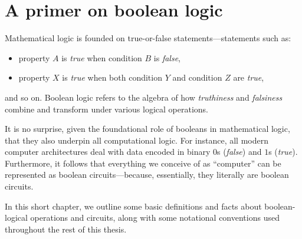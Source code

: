 \chapter{A primer on boolean logic}

Mathematical logic is founded on true-or-false statements---statements such as:
\begin{itemize}[nosep]
  \item property \(A\) is \emph{true} when condition \(B\) is \emph{false},
  \item property \(X\) is \emph{true} when both condition \(Y\) and condition
    \(Z\) are \emph{true},
\end{itemize}
and so on.  Boolean logic refers to the algebra of how \emph{truthiness} and
\emph{falsiness} combine and transform under various logical operations.

It is no surprise, given the foundational role of booleans in mathematical
logic, that they also underpin all computational logic. For instance, all
modern computer architectures deal with data encoded in binary \(0\)s
(\emph{false}) and \(1\)s (\emph{true}).  Furthermore, it follows that
everything we conceive of as ``computer'' can be represented as boolean
circuits---because, essentially, they literally are boolean circuits.


In this short chapter, we outline some basic definitions and facts about
boolean-logical operations and circuits, along with some notational conventions
used throughout the rest of this thesis.

